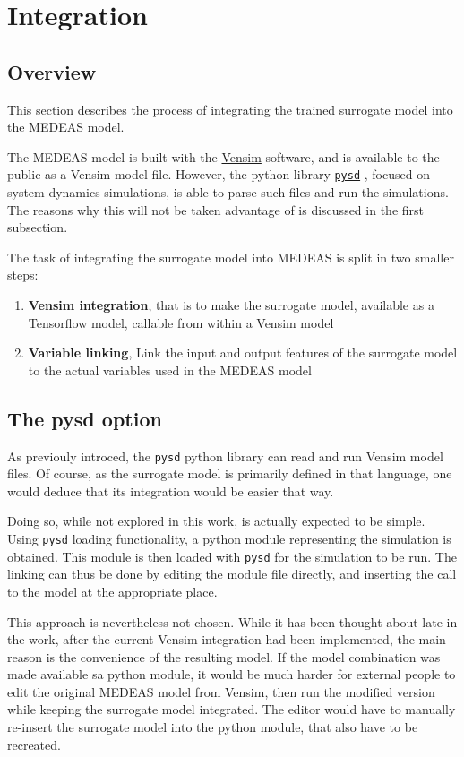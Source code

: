 \section{Integration}

\subsection{Overview}

This section describes the process of integrating the trained surrogate model into the MEDEAS model.

The MEDEAS model is built with the \href{https://vensim.com/}{Vensim} software, and is available to the public as a Vensim model file. However, the python library \href{https://pysd.readthedocs.io/en/master/index.html}{\texttt{pysd}} \cite{pysd}, focused on system dynamics simulations, is able to parse such files and run the simulations. The reasons why this will not be taken advantage of is discussed in the first subsection.

The task of integrating the surrogate model into MEDEAS is split in two smaller steps:
\begin{enumerate}
    \item \textbf{Vensim integration}, that is to make the surrogate model, available as a Tensorflow model, callable from within a Vensim model
    \item \textbf{Variable linking}, Link the input and output features of the surrogate model to the actual variables used in the MEDEAS model
\end{enumerate}

\subsection{The pysd option}

As previouly introced, the \texttt{pysd} python library can read and run Vensim model files. Of course, as the surrogate model is primarily defined in that language, one would deduce that its integration would be easier that way.

Doing so, while not explored in this work, is actually expected to be simple. Using \texttt{pysd} loading functionality, a python module representing the simulation is obtained. This module is then loaded with \texttt{pysd} for the simulation to be run. The linking can thus be done by editing the module file directly, and inserting the call to the model at the appropriate place. 

This approach is nevertheless not chosen. While it has been thought about late in the work, after the current Vensim integration had been implemented, the main reason is the convenience of the resulting model. If the model combination was made available sa python module, it would be much harder for external people to edit the original MEDEAS model from Vensim, then run the modified version while keeping the surrogate model integrated. The editor would have to manually re-insert the surrogate model into the python module, that also have to be recreated.

